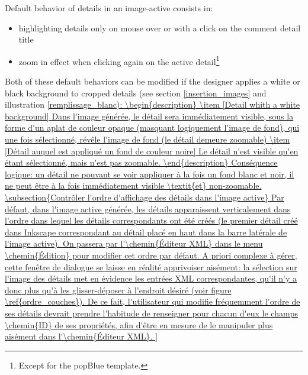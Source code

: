 Default behavior of details in an image-active consists in:
\begin{itemize}
 \item highlighting details only on mouse over or with a click on the comment 
 detail title
 \item zoom in effect when clicking again on the active detail\footnote{Except 
 for the popBlue template.}
\end{itemize}

Both of these default behaviors can be modified if the designer applies a white
 or black background to cropped details (see section \ref{insertion_images} 
 and illustration \ref{remplissage_blanc):
\begin{description}
 \item [Detail whith a white background] Dans l'image générée, 
 le détail sera immédiatement visible, sous la forme d'un aplat de couleur opaque (masquant
 logiquement l'image de fond), qui une fois sélectionné, révêle l'image de fond (le détail demeure zoomable)
 \item [Détail auquel est appliqué un fond de couleur noire] Le détail n'est visible qu'en étant sélectionné, mais
 n'est pas zoomable.
\end{description}

Conséquence logique: un détail ne pouvant se voir appliquer à la fois un fond blanc et noir, il ne peut être à la
fois immédiatement visible \textit{et} non-zoomable.

\subsection{Contrôler l'ordre d'affichage des détails dans l'image active}

Par défaut, dans l'image active générée, les détails apparaissent verticalement dans l'ordre 
dans lequel les détails correspondants ont été créés (le premier détail créé dans Inkscape 
correspondant au détail placé en haut dans la barre latérale de l'image active).

On passera par l'\chemin{Éditeur XML} dans le menu \chemin{Édition} pour modifier cet 
ordre par défaut.

A priori complexe à gérer, cette fenêtre de dialogue se laisse en réalité apprivoiser aisément: 
la sélection sur l'image des détails met en évidence les entrées XML correspondantes, qu'il n'y 
a donc plus qu'à les glisser-déposer à l'endroit désiré (voir figure \ref{ordre_couches}).

De ce fait, l'utilisateur qui modifie fréquemment l'ordre de ses détails devrait prendre l'habitude 
de renseigner pour chacun d'eux le champs \chemin{ID} de ses propriétés, afin d'être en mesure 
de le manipuler plus aisément dans l'\chemin{Éditeur XML}.

}
